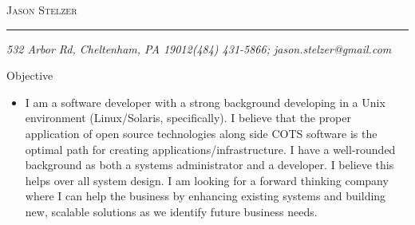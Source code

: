 \documentclass[11pt,oneside]{article}
\makeatletter
\newcommand{\name}{Jason Stelzer}
\newcommand{\addr}{532 Arbor Rd, Cheltenham, PA 19012}
\newcommand{\phone}{(484) 431-5866}
\newcommand{\email}{jason.stelzer@gmail.com}
\newcommand{\bigname}[1]{
	\begin{center}\fontfamily{phv}\selectfont\Huge\scshape#1\end{center}
}
\newenvironment{ressection}[1]{
	\vspace{4pt}
	{\fontfamily{phv}\selectfont\Large#1}
	\begin{itemize}
	\vspace{3pt}
}{
	\end{itemize}
}
\newcommand{\resitem}[1]{
	\vspace{-4pt}
	\item \begin{flushleft} #1 \end{flushleft}
}
\makeatother
\begin{document}
 \selectfont

\bigname{\name}

\vspace{-8pt} \rule{\textwidth}{1pt}

\vspace{-1pt} {\small\itshape \addr \hfill \phone; \email}

\vspace{8 pt}


\begin{ressection}{Objective}

	\resitem{I am a software developer with a strong background developing in a Unix environment (Linux/Solaris, specifically). I believe that the proper application of open source technologies along side COTS software is the optimal path for creating applications/infrastructure. I have a well-rounded background as both a systems administrator and a developer. I believe this helps over all system design. I am looking for a forward thinking company where I can help the business by enhancing existing systems and building new, scalable solutions as we identify future business needs.}
	
\end{ressection}
\end{document}

